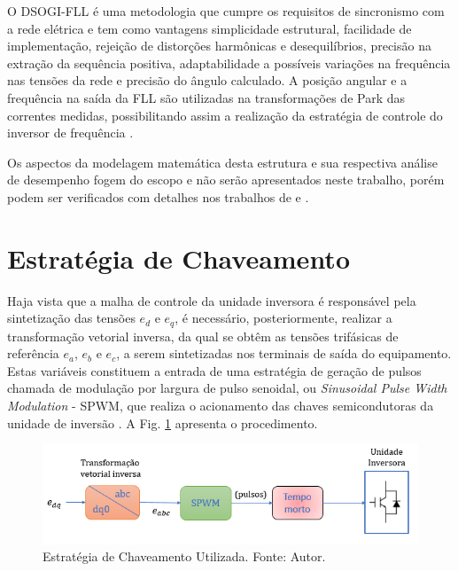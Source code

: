 O DSOGI-FLL é uma metodologia que cumpre os requisitos de sincronismo com a rede elétrica e tem como vantagens simplicidade estrutural, facilidade de implementação, rejeição de distorções harmônicas e desequilíbrios, precisão na extração da sequência positiva, adaptabilidade a possíveis variações na frequência nas tensões da rede e precisão do ângulo calculado. A posição angular e a frequência na saída da FLL são utilizadas na transformações de Park das correntes medidas, possibilitando assim a realização da estratégia de controle do inversor de frequência \cite{DissertacaoJoao}.

Os aspectos da modelagem matemática desta estrutura e sua respectiva análise de desempenho fogem do escopo e não serão apresentados neste trabalho, porém podem ser verificados com detalhes nos trabalhos de \cite{ArticleRodriguez} e \cite{book-remusteodorescu201b1}.

\section{Estratégia de Chaveamento}

Haja vista que a malha de controle da unidade inversora é responsável pela sintetização das tensões $e_d$ e $e_q$, é necessário, posteriormente, realizar a transformação vetorial inversa, da qual se obtêm as tensões trifásicas de referência $e_a$, $e_b$ e $e_c$, a serem sintetizadas nos terminais de saída do equipamento. Estas variáveis constituem a entrada de uma estratégia de geração de pulsos chamada de modulação por largura de pulso senoidal, ou \textit{Sinusoidal Pulse Width Modulation} - SPWM, que realiza o acionamento das chaves semicondutoras da unidade de inversão \cite{MRashid}. A Fig. \ref{fig:Estrategia_Chaveamento} apresenta o procedimento. 

\begin{figure}[!hbt]
	\begin{center}
		\includegraphics[width=\columnwidth]{figuras/Estrategia_Chaveamento.PNG}
		\caption{Estratégia de Chaveamento Utilizada. Fonte: Autor.}
		\label{fig:Estrategia_Chaveamento}
	\end{center}
\end{figure}

